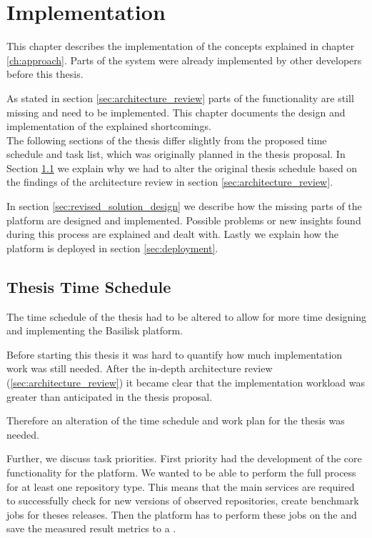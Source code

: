 \chapter{Implementation}
\label{ch:implementation}



This chapter describes the implementation of the concepts explained in chapter \ref{ch:approach}.
Parts of the system were already implemented by other developers before this thesis.

As stated in section \ref{sec:architecture_review} parts of the functionality are still missing and need to be implemented.
This chapter documents the design and implementation of the explained shortcomings.
\\

The following sections of the thesis differ slightly from the proposed time schedule and task list, which was originally planned in the thesis proposal.
In Section \ref{sec:time_schedule} we explain why we had to alter the original thesis schedule based on the findings of the architecture review in section \ref{sec:architecture_review}.

In section \ref{sec:revised_solution_design} we describe how the missing parts of the platform are designed and implemented.
Possible problems or new insights found during this process are explained and dealt with.
Lastly we explain how the platform is deployed in section \ref{sec:deployment}.



\section{Thesis Time Schedule}
\label{sec:time_schedule}
The time schedule of the thesis had to be altered to allow for more time designing and implementing the Basilisk platform.

Before starting this thesis it was hard to quantify how much implementation work was still needed.
After the in-depth architecture review (\ref{sec:architecture_review}) it became clear that the implementation workload was greater than anticipated in the thesis proposal.

Therefore an alteration of the time schedule and work plan for the thesis was needed.

Further, we discuss task priorities.
First priority had the development of the core functionality for the platform.
We wanted to be able to perform the full process for at least one repository type.
This means that the main services are required to successfully check for new versions of observed repositories, create benchmark jobs for theses releases. 
Then the platform has to perform these jobs on the \tsp{} and save the measured result metrics to a \ts{}.

